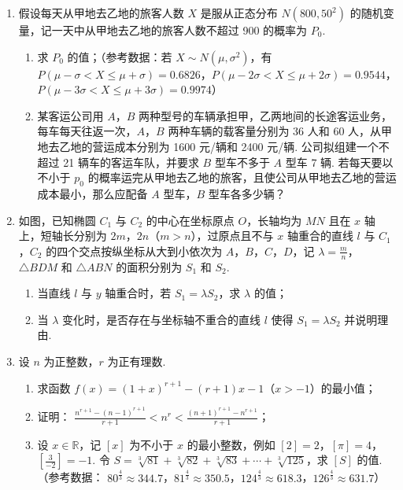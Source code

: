\begin{description}
\begin{enumerate}[leftmargin=5pt]
        \item 假设每天从甲地去乙地的旅客人数 \(X\) 是服从正态分布 \(N(800,50^{2})\) 的随机变量，记一天中从甲地去乙地的旅客人数不超过 900 的概率为 \(P_{0}\).
\begin{enumerate}
\item 求 \(P_{0}\) 的值；（参考数据：若 \(X \sim N(\mu, \sigma^{2})\)，有 \(P(\mu - \sigma < X \leqslant \mu + \sigma) = 0.6826\)，\(P(\mu - 2\sigma < X \leqslant \mu + 2\sigma) = 0.9544\)，\(P(\mu - 3\sigma < X \leqslant \mu + 3\sigma) = 0.9974\)）
\item 某客运公司用 \(A\)，\(B\) 两种型号的车辆承担甲，乙两地间的长途客运业务，每车每天往返一次，\(A\)，\(B\) 两种车辆的载客量分别为 36 人和 60 人，从甲地去乙地的营运成本分别为 1600 元/辆和 2400 元/辆. 公司拟组建一个不超过 21 辆车的客运车队，并要求 \(B\) 型车不多于 \(A\) 型车 7 辆. 若每天要以不小于 \(p_0\) 的概率运完从甲地去乙地的旅客，且使公司从甲地去乙地的营运成本最小，那么应配备 \(A\) 型车，\(B\) 型车各多少辆？
\end{enumerate}

        \item 如图，已知椭圆 \(C_1\) 与 \(C_2\) 的中心在坐标原点 \(O\)，长轴均为 \(MN\) 且在 \(x\) 轴上，短轴长分别为 \(2m\)，\(2n\)（\(m > n\)），过原点且不与 \(x\) 轴重合的直线 \(l\) 与 \(C_1\)，\(C_2\) 的四个交点按纵坐标从大到小依次为 \(A\)，\(B\)，\(C\)，\(D\)，记 \(\lambda = \frac{m}{n}\)，\(\triangle BDM\) 和 \(\triangle ABN\) 的面积分别为 \(S_1\) 和 \(S_2\).
\begin{enumerate}
\item 当直线 \(l\) 与 \(y\) 轴重合时，若 \(S_{1} = \lambda S_{2}\)，求 \(\lambda\) 的值；
\item 当 \(\lambda\) 变化时，是否存在与坐标轴不重合的直线 \(l\) 使得 \(S_{1} = \lambda S_{2}\) 并说明理由.
\end{enumerate}

        \item 设 \(n\) 为正整数，\(r\) 为正有理数.
\begin{enumerate}
\item 求函数 \( f(x) = (1 + x)^{r + 1} - (r + 1)x - 1 \)（\(x > -1\)）的最小值；
\item 证明： \(\frac{n^{r+1} - (n-1)^{r+1}}{r+1} < n^{r} < \frac{(n+1)^{r+1} - n^{r+1}}{r+1}\)；
\item 设 \(x \in \mathbb{R}\)，记 \([x]\) 为不小于 \(x\) 的最小整数，例如 \([2] = 2\)，\([\pi] = 4\)，\(\left[\frac{3}{-2}\right] = -1\). 令 \(S = \sqrt[3]{81} + \sqrt[3]{82} + \sqrt[3]{83} + \cdots + \sqrt[3]{125}\)，求 \([S]\) 的值.（参考数据： \(80^{\frac{4}{3}} \approx 344.7\)，\(81^{\frac{4}{3}} \approx 350.5\)，\(124^{\frac{4}{3}} \approx 618.3\)，\(126^{\frac{4}{3}} \approx 631.7\)）
\end{enumerate}

    \end{enumerate}

\end{description}


